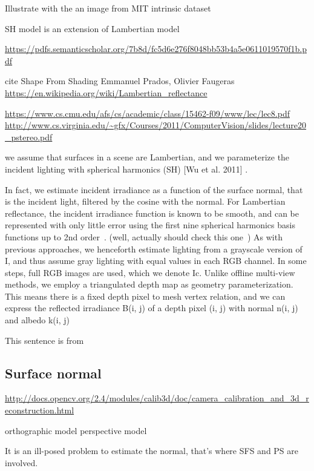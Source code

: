 Illustrate with the an image from MIT intrinsic dataset~\cite{grosse2009ground}

SH model is an extension of Lambertian model

  \url{https://pdfs.semanticscholar.org/7b8d/fc5d6e276f8048bb53b4a5e0611019570f1b.pdf}
\cite{basri2003lambertian}

cite Shape From Shading Emmanuel Prados, Olivier Faugeras
\url{https://en.wikipedia.org/wiki/Lambertian_reflectance}

\url{https://www.cs.cmu.edu/afs/cs/academic/class/15462-f09/www/lec/lec8.pdf}
\url{http://www.cs.virginia.edu/~gfx/Courses/2011/ComputerVision/slides/lecture20_pstereo.pdf}


we assume that surfaces in a scene are Lambertian, and we parameterize the incident lighting with spherical harmonics (SH) [Wu et al. 2011] \cite{wu2011shading}.

In fact, we estimate incident irradiance as a function of the surface normal, that is the incident light, filtered by the cosine with the normal. For Lambertian reflectance, the incident irradiance function is known to be smooth, and can be represented with only little error using the first nine spherical harmonics basis functions up to 2nd order~\cite{ramamoorthi2001efficient}. (well, actually should check this one~\cite{ramamoorthi2001relationship})
As with previous approaches, we henceforth estimate lighting from a grayscale version of I, and thus assume gray lighting with equal values in each RGB channel. In some steps, full RGB images are used, which we denote Ic. Unlike offline multi-view methods, we employ a triangulated depth map as geometry parameterization. This means there is a fixed depth pixel to mesh vertex relation, and we can express the reflected irradiance B(i, j) of a depth pixel (i, j) with normal n(i, j) and albedo k(i, j)

This sentence is from\cite{wu2014real}


\subsection{Surface normal}
\url{http://docs.opencv.org/2.4/modules/calib3d/doc/camera_calibration_and_3d_reconstruction.html}

orthographic model
perspective model

It is an ill-posed problem to estimate the normal, that's where SFS and PS are involved. 

